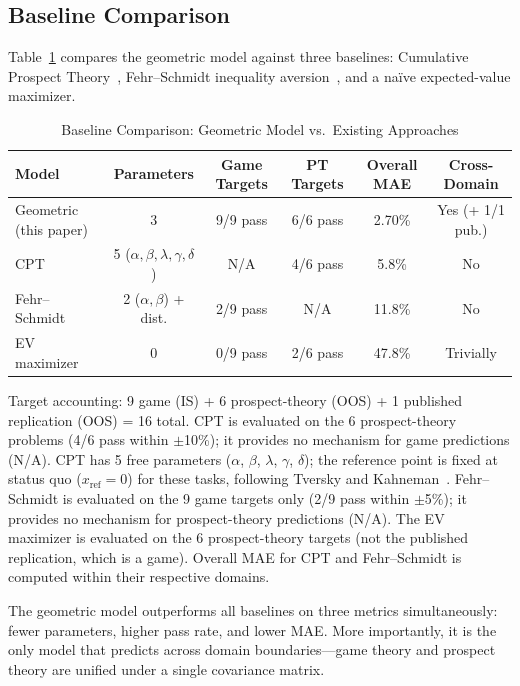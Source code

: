 \documentclass[journal]{IEEEtran}
\begin{document}
\subsection{Baseline Comparison}

Table~\ref{tab:comparison} compares the geometric model against three baselines: Cumulative Prospect Theory~\cite{tversky1992}, Fehr--Schmidt inequality aversion~\cite{fehr1999}, and a na\"ive expected-value maximizer.

\begin{table}[!t]
\renewcommand{\arraystretch}{1.2}
\caption{Baseline Comparison: Geometric Model vs.\ Existing Approaches}
\label{tab:comparison}
\centering
\begin{tabular}{l c c c c c}
\toprule
\textbf{Model} & \textbf{Parameters} & \textbf{Game Targets} & \textbf{PT Targets} & \textbf{Overall MAE} & \textbf{Cross-Domain} \\
\midrule
Geometric (this paper) & 3 & 9/9 pass & 6/6 pass & 2.70\% & Yes (+ 1/1 pub.) \\
CPT~\cite{tversky1992} & 5 ($\alpha,\beta,\lambda,\gamma,\delta$) & N/A & 4/6 pass & 5.8\% & No \\
Fehr--Schmidt~\cite{fehr1999} & 2 ($\alpha,\beta$) + dist. & 2/9 pass & N/A & 11.8\% & No \\
EV maximizer & 0 & 0/9 pass & 2/6 pass & 47.8\% & Trivially \\
\bottomrule
\end{tabular}
\begin{flushleft}
\footnotesize{Target accounting: 9 game (IS) + 6 prospect-theory (OOS) + 1 published replication (OOS) = 16 total.
CPT is evaluated on the 6 prospect-theory problems (4/6 pass within $\pm$10\%); it provides no mechanism for game predictions (N/A).
CPT has 5 free parameters ($\alpha$, $\beta$, $\lambda$, $\gamma$, $\delta$); the reference point is fixed at status quo ($x_{\text{ref}} = 0$) for these tasks, following Tversky and Kahneman~\cite{tversky1992}.
Fehr--Schmidt is evaluated on the 9 game targets only (2/9 pass within $\pm$5\%); it provides no mechanism for prospect-theory predictions (N/A).
The EV maximizer is evaluated on the 6 prospect-theory targets (not the published replication, which is a game).
Overall MAE for CPT and Fehr--Schmidt is computed within their respective domains.}
\end{flushleft}
\end{table}

The geometric model outperforms all baselines on three metrics simultaneously: fewer parameters, higher pass rate, and lower MAE.
More importantly, it is the only model that predicts across domain boundaries---game theory and prospect theory are unified under a single covariance matrix.
\end{document}
